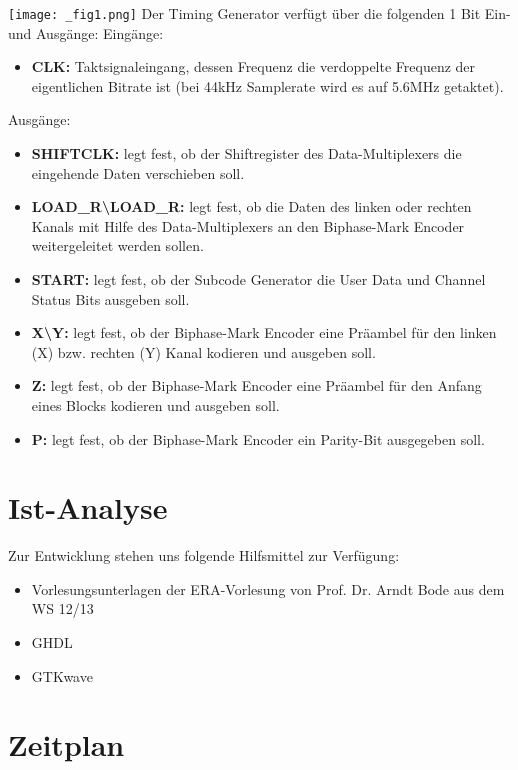 \documentclass[12pt,a4paper]{article}
\begin{document}
\noindent
\texttt{[image: \_fig1.png]}\newline \newline
\noindent
Der Timing Generator verfügt über die folgenden 1 Bit Ein- und Ausgänge: \newline \newline
Eingänge:
\begin{itemize}
\item {\bf CLK:} Taktsignaleingang, dessen Frequenz die verdoppelte Frequenz der eigentlichen Bitrate ist (bei 44kHz Samplerate wird es auf 5.6MHz getaktet).
\end {itemize}
\noindent
Ausgänge:
\begin {itemize}
\item {\bf SHIFTCLK:} legt fest, ob der Shiftregister des Data-Multiplexers die eingehende Daten verschieben soll.
\item {\bf LOAD\_R\textbackslash LOAD\_R:} legt fest, ob die Daten des linken oder rechten Kanals mit Hilfe des Data-Multiplexers an den Biphase-Mark Encoder weitergeleitet werden sollen.
\item {\bf START:} legt fest, ob der Subcode Generator die User Data und Channel Status Bits ausgeben soll.
\item {\bf X\textbackslash Y:} legt fest, ob der Biphase-Mark Encoder eine Präambel für den linken (X) bzw. rechten (Y) Kanal kodieren und ausgeben soll.
\item {\bf Z:} legt fest, ob der Biphase-Mark Encoder eine Präambel für den Anfang eines Blocks kodieren und ausgeben soll.
\item {\bf P:} legt fest, ob der Biphase-Mark Encoder ein Parity-Bit ausgegeben soll.
\end{itemize}
\newpage

\section{Ist-Analyse}

Zur Entwicklung stehen uns folgende Hilfsmittel zur Verfügung:	
\begin{itemize}
\item Vorlesungsunterlagen der ERA-Vorlesung von Prof. Dr. Arndt Bode aus dem WS 12/13
\item GHDL
\item GTKwave
\end{itemize}	

\section{Zeitplan}
\end{document}
